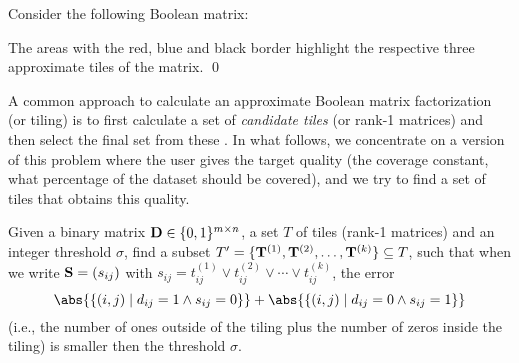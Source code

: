 \begin{example}\label{ex:tiling}
Consider the following Boolean matrix: 
\begin{center}
\end{center}
The areas with the red, blue and black border highlight the respective three approximate tiles of the matrix. \qed
\end{example}

A common approach to calculate an approximate Boolean matrix factorization (or tiling) is to first calculate a set of \emph{candidate tiles} (or rank-1 matrices) and then select the final set from these \parencite{dbp,tyukin14bmad}. In what follows, we concentrate on a version of this problem where the user gives the target quality \pubrev(the coverage constant, what percentage of the dataset should be covered)\pubrevend, and we try to find a set of tiles that obtains  this quality. 


\begin{definition}
  \label{def:probtile}
Given a binary matrix $\mathbf{D}\in\{0,1\}^{m\times n}$, a set $T$ of tiles (rank-1 matrices) and an integer threshold $\sigma$, find a subset $T' = \{\mathbf{T}^{(1)}, \mathbf{T}^{(2)}, \ldots, \mathbf{T}^{(k)}\}\subseteq T$, such that when we write $\mathbf{S} = (s_{ij})$ with $s_{ij} = t^{(1)}_{ij} \lor t^{(2)}_{ij} \lor \cdots \lor t^{(k)}_{ij}$,
the error
\begin{equation}\label{eq:probtile_err}
  \abs{\{(i, j)\mid d_{ij} = 1 \land s_{ij} = 0\}} + \abs{\{(i, j) \mid d_{ij} = 0 \land s_{ij} = 1\}}
\end{equation}
(i.e., the number of ones outside of the tiling plus the number of zeros inside the tiling) is smaller then the threshold $\sigma$.
\end{definition}

